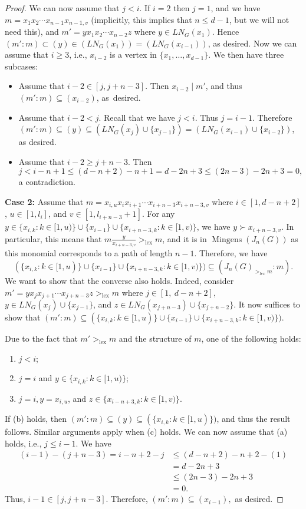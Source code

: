 \documentclass{amsart}
\theoremstyle{remark}
\theoremstyle{definition}
\DeclareMathOperator{\mingens}{Mingens}
\DeclareMathOperator{\lex}{lex}
\begin{document}
\begin{proof}
		We can now assume that $j<i$. If $i=2$ then $j=1$, and we have $m=x_1x_2\cdots x_{n-1}x_{n-1,v}$ (implicitly, this implies that $n\leq d-1$, but we will not need this), and $m'=yx_1x_2\cdots x_{n-2} z$ where $y\in LN_G(x_1)$. Hence $(m'\colon m) \subset (y)\in (LN_G(x_1))=(LN_G(x_{i-1}))$, as desired. Now we can assume that $i\geq 3$, i.e., $x_{i-2}$ is a vertex in $\{x_1,\dots, x_{d-1}\}$. We then have three subcases:
		\begin{itemize}
			\item Assume that $i-2\in [j,j+n-3]$. Then $x_{i-2}\mid m'$, and thus $(m'\colon m) \subseteq (x_{i-2})$, as~desired.
			\item Assume that $i-2<j$. Recall that we have $j<i$. Thus $j=i-1$. Therefore $(m'\colon m)\subseteq (y)\subseteq (LN_G(x_{j})\cup \{x_{j-1}\}) = (LN_G(x_{i-1})\cup \{x_{i-2}\})$, as desired.
			\item Assume that $i-2\geq j+n-3$. Then \[
			j<i-n+1 \leq (d-n+2)-n+1 = d-2n+3 \leq (2n-3)-2n+3 =0,
			\]
			a contradiction.
		\end{itemize}
		
		\textbf{Case 2:} Assume that $m=x_{i,u}x_ix_{i+1}\cdots x_{i+n-3}x_{i+n-3,v}$ where $i\in [1, d-n+2]$, $u\in [1,l_i]$, and $v\in [1, l_{i+n-3}+1]$.    
		For any $y\in \{ x_{i,k} \colon k\in [1,u) \} \cup \{x_{i-1}\} \cup \{x_{i+n-3,k}\colon k\in [1,v)\}$, we have $y\succ x_{i+n-3,v}$. In particular, this means that  $m\frac{y}{x_{i+n-3,v}} >_{\lex} m$, and it is in $\mingens(J_n(G))$ as this monomial corresponds to a path of length $n-1$. Therefore, we have 
		\[
		(\{ x_{i,k} \colon k\in [1,u) \} \cup \{x_{i-1}\} \cup \{x_{i+n-3,k}\colon k\in [1,v)\}) \subseteq (J_n(G)_{>_{lex}m} \colon m).
		\]
		We want to show that the converse also holds. Indeed, consider $m'=yx_jx_{j+1}\cdots x_{j+n-3}z>_{\lex}  m$ where $j\in [1,\ d-n+2]$, $y\in LN_G(x_j)\cup \{x_{j-1}\}$, and $z\in  LN_G(x_{j+n-3})\cup \{x_{j+n-2}\}$. It now suffices to show that $(m':m)\subseteq (\{ x_{i,k} \colon k\in [1,u) \} \cup \{x_{i-1}\} \cup \{x_{i+n-3,k}\colon k\in [1,v)\})$.
		
		Due to the fact that $m'>_{\lex}  m$ and the structure of $m$, one of the following holds:
		\begin{enumerate}
			\item[(a)] $j<i$;
			\item[(b)] $j=i$ and $y\in \{ x_{i,k}\colon k\in [1,u)\}$;
			\item[(c)] $j=i, y=x_{i,u}$, and $z\in \{x_{i-n+3,k}\colon k\in [1,v)\}$. 
		\end{enumerate}
		If (b) holds, then $(m'\colon m)\subseteq (y)\subseteq (\{ x_{i,k}\colon k\in [1,u)\})$, and thus the result follows. Similar arguments apply when (c) holds. We can now assume that (a) holds, i.e., $j\leq i-1$. We have 
		\begin{align*}
			(i-1)-(j+n-3) = i-n+2-j &\leq (d-n+2) -n+2-(1) \\
			&= d-2n+3\\
			&\leq (2n-3)-2n+3\\
			&=0.        
		\end{align*}
		Thus, $i-1\in [j,j+n-3]$. Therefore, $(m'\colon m)\subseteq (x_{i-1}),$ as desired. 
	\end{proof}
\end{document}
